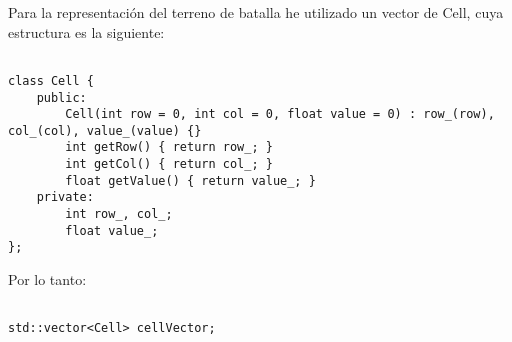 Para la representación del terreno de batalla he utilizado un vector de Cell, cuya estructura es la siguiente:

\begin{lstlisting}

class Cell {
    public:
        Cell(int row = 0, int col = 0, float value = 0) : row_(row), col_(col), value_(value) {}
        int getRow() { return row_; }
        int getCol() { return col_; }
        float getValue() { return value_; }
    private:
        int row_, col_;
        float value_;
};

\end{lstlisting}

Por lo tanto: 

\begin{lstlisting}

std::vector<Cell> cellVector;

\end{lstlisting}
